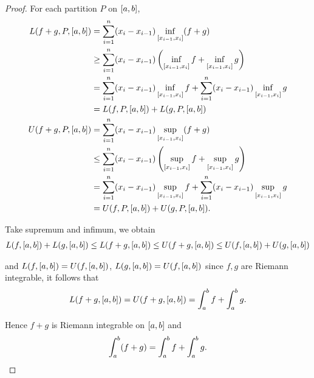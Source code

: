 \begin{proof}
    For each partition $P$ on $\left[{a, b}\right]$,
    \begin{align*}
        L(f + g, P, \left[{a, b}\right]) & = \sum^{n}_{i=1}(x_{i} - x_{i-1})\inf\limits_{\left[{x_{i-1}, x_{i}}\right]}(f + g)                                                                           \\
                                           & \geq \sum^{n}_{i=1}(x_{i} - x_{i-1})\left(\inf\limits_{\left[{x_{i-1}, x_{i}}\right]}f + \inf\limits_{\left[{x_{i-1}, x_{i}}\right]}g\right)                \\
                                           & = \sum^{n}_{i=1}(x_{i} - x_{i-1})\inf\limits_{\left[{x_{i-1}, x_{i}}\right]}f + \sum^{n}_{i=1}(x_{i} - x_{i-1})\inf\limits_{\left[{x_{i-1}, x_{i}}\right]}g \\
                                           & = L(f, P, \left[{a, b}\right]) + L(g, P, \left[{a, b}\right])                                                                                               \\
        U(f + g, P, \left[{a, b}\right]) & = \sum^{n}_{i=1}(x_{i} - x_{i-1})\sup_{\left[{x_{i-1}, x_{i}}\right]}(f + g)                                                                                  \\
                                           & \leq \sum^{n}_{i=1}(x_{i} - x_{i-1})\left(\sup_{\left[{x_{i-1}, x_{i}}\right]}f + \sup_{\left[{x_{i-1}, x_{i}}\right]}g\right)                              \\
                                           & = \sum^{n}_{i=1}(x_{i} - x_{i-1})\sup_{\left[{x_{i-1}, x_{i}}\right]}f + \sum^{n}_{i=1}(x_{i} - x_{i-1})\sup_{\left[{x_{i-1}, x_{i}}\right]}g               \\
                                           & = U(f, P, \left[{a, b}\right]) + U(g, P, \left[{a, b}\right]).
    \end{align*}

    Take supremum and infimum, we obtain
    \[
        \begin{split}
            L(f, \left[{a, b}\right]) + L(g, \left[{a, b}\right]) \leq L(f + g, \left[{a, b}\right]) \leq U(f + g, \left[{a, b}\right])\leq U(f, \left[{a, b}\right]) + U(g, \left[{a, b}\right])
        \end{split}
    \]

    and $L(f, \left[{a, b}\right]) = U(f, \left[{a, b}\right])$, $L(g, \left[{a, b}\right]) = U(f, \left[{a, b}\right])$ since $f, g$ are Riemann integrable, it follows that
    \[
        L(f+g, \left[{a, b}\right]) = U(f+g, \left[{a, b}\right]) = \int^{b}_{a}f + \int^{b}_{a}g.
    \]

    Hence $f + g$ is Riemann integrable on $\left[{a, b}\right]$ and
    \[
        \int^{b}_{a}(f + g) = \int^{b}_{a}f + \int^{b}_{a}g.\qedhere
    \]
\end{proof}
\newpage

